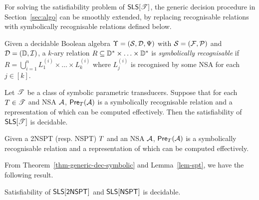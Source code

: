 For solving the satisfiability problem of $\textsf{SLS}[\mathscr{T}]$, the generic decision procedure in Section~\ref{sec:algo} can be smoothly extended, by replacing recognisable relations with symbolically recognisable relations defined below.

\begin{definition}
	Given a decidable Boolean algebra $\Upsilon=(\mathcal{S}, \mathcal{D}, \Psi)$ with $\mathcal{S} = ({\mathcal{F}}, {\mathcal{P}})$ and $\mathcal{D} = (\mathbb{D}, \mathcal{I})$, a $k$-ary relation $R \subseteq \mathbb{D}^*\times \ldots\times \mathbb{D}^*$ is \emph{symbolically recognisable} if $R=\bigcup_{i=1}^n L^{(i)}_1 \times \ldots \times L^{(i)}_k$ where $L^{(i)}_j$ is recognised by some NSA for each $j\in [k]$.
\end{definition}


\begin{theorem}\label{thm-generic-dec-symbolic}
Let $\mathscr{T}$ be a class of symbolic parametric transducers. Suppose that %
for each $T \in \mathscr{T}$ and NSA $\mathcal{A}$, $\textsf{Pre}_{T}(\mathcal{A})$ is a symbolically recognisable relation and a representation of which can be computed effectively. Then the satisfiability of $\textsf{SLS}[\mathscr{T}]$ is decidable.
\end{theorem}

\begin{lemma}\label{lem-spt}
Given a 2NSPT (resp. NSPT) $T$ and an NSA $\mathcal{A}$, $\textsf{Pre}_{T}(\mathcal{A})$ is a symbolically recognisable relation and a representation of which can be computed effectively.
\end{lemma}

From Theorem~\ref{thm-generic-dec-symbolic} and Lemma~\ref{lem-spt}, we have the following result.
\begin{theorem}
Satisfiability of $\textsf{SLS}[\textsf{2NSPT}]$ and $\textsf{SLS}[\textsf{NSPT}]$ is decidable.
\end{theorem}




